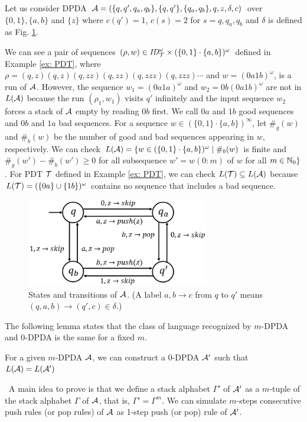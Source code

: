 \begin{example}
\label{ex: PDA}
Let us consider DPDA
${\cal A} = (\{q,q',q_a,q_b\},\{q,q'\},\{q_a,q_b\},q,z,\delta,c)$
over $\{0,1\},\{a,b\}$ and $\{z\}$ where
$c(q')=1$, $c(s)=2$ for $s=q,q_a,q_b$ and
$\delta$ is defined as Fig. \ref{fig: PDA}.


We can see
a pair of sequences $(\rho,w)\in \mathit{ID}_{\cal T}^\omega\times (\{0,1\}\cdot\{a,b\})^\omega$ defined in Example \ref{ex: PDT},
where $\rho=(q,z)(q,z)(q,zz)(q,zz)(q,zzz)(q,zzz)\cdots$
and $w=(0a1b)^\omega$,
is a run of ${\cal A}$.
However, the sequence $w_1=(0a1a)^\omega$ and $w_2=0b(0a1b)^\omega$
are not in $L({\cal A})$ because
the run $(\rho_1,w_1)$ visits $q'$ infinitely and
the input sequence $w_2$ forces a stack of ${\cal A}$ empty
by reading $0b$ first.
We call $0a$ and $1b$ good sequences and $0b$ and $1a$ bad sequences.
For a sequence $w\in(\{0,1\}\cdot\{a,b\})^\infty$,
let $\#_g(w)$ and $\#_b(w)$ be the number of
good and bad sequences appearing in $w$, respectively.
We can check
$L({\cal A})=\{w\in(\{0,1\}\cdot\{a,b\})^\omega\mid
\#_b(w)$ is finite and
$\#_g(w')-\#_b(w')\geq 0$
for all subsequence $w'=w(0:m)$ of $w$ for all $m\in\mathbb{N}_0\}$.
For PDT ${\cal T}$ defined in Example \ref{ex: PDT},
we can check $L({\cal T})\subseteq L({\cal A})$
because $L({\cal T})=(\{0a\}\cup\{1b\})^\omega$ contains no sequence that includes a bad sequence.
\end{example}
\begin{figure}[t]
  \centering
  \includegraphics[width=8cm]{PDA.png}
  \caption{States and transitions of ${\cal A}$.
  (A label $a,b \to c$ from $q$ to $q'$ means
  $(q,a,b)\to(q',c)\in\delta$.)}
  \label{fig: PDA}
\end{figure}

The following lemma states that
the class of language recognized by $m$-DPDA and $0$-DPDA is the same
for a fixed $m$.
\begin{lemma}
\label{lem: ef}
For a given $m$-DPDA ${\cal A}$,
we can construct a $0$-DPDA ${\cal A}'$ such that
$L({\cal A})=L({\cal A}')$
\end{lemma}\
A main idea to prove is that
we define a stack alphabet $\Gamma'$ of ${\cal A}'$ as a $m$-tuple of
the stack alphabet $\Gamma$ of ${\cal A}$, that is, $\Gamma'=\Gamma^m$.
We can simulate $m$-steps consecutive push rules (or pop rules) of ${\cal A}$
as 1-step push (or pop) rule of ${\cal A}'$.

